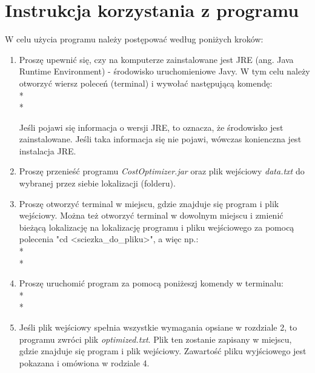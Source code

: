 \documentclass[11pt]{article}
\begin{document}
\section{Instrukcja korzystania z programu}
W celu użycia programu należy postępować według poniżych kroków:
\begin{enumerate}
    \item Proszę upewnić się, czy na komputerze zainstalowane jest JRE (ang. Java Runtime Environment) - środowisko uruchomieniowe Javy. W tym celu należy otworzyć wiersz poleceń (terminal) i wywołać następującą komendę:\\*\\*
    
    \vspace{1em}
    Jeśli pojawi się informacja o wersji JRE, to oznacza, że środowisko jest zainstalowane. Jeśli taka informacja się nie pojawi, wówczas konienczna jest instalacja JRE.
    \item Proszę przenieść programu \emph{CostOptimizer.jar} oraz plik wejściowy \emph{data.txt} do wybranej przez siebie lokalizacji (folderu). 
    \item Proszę otworzyć terminal w miejscu, gdzie znajduje się program i plik wejściowy. Można też otworzyć terminal w dowolnym miejscu i zmienić bieżącą lokalizację na lokalizację programu i pliku wejściowego za pomocą polecenia "cd \textless sciezka\_do\_pliku\textgreater", a więc np.:\\*\\*
    
    \vspace{1em}
    \item Proszę uruchomić program za pomocą poniżeszj komendy w terminalu:\\*\\*
    
    \vspace{1em}
    \item Jeśli plik wejściowy spełnia wszystkie wymagania opsiane w rozdziale 2, to programu zwróci plik \emph{optimized.txt}. Plik ten zostanie zapisany w miejscu, gdzie znajduje się program i plik wejściowy. Zawartość pliku wyjściowego jest pokazana i omówiona w rodziale 4.
\end{enumerate}
\end{document}
